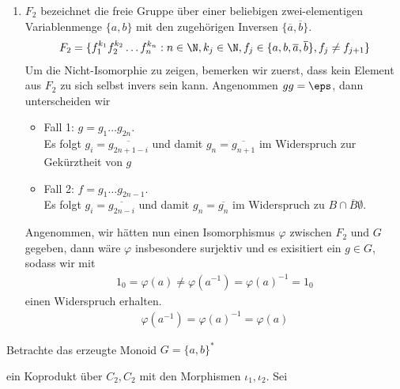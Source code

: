 \begin{solution}
\begin{enumerate}
  \item $F_2$ bezeichnet die freie Gruppe über einer beliebigen zwei-elementigen
  Variablenmenge $\{a,b\}$ mit den zugehörigen Inversen $\{\overline{a},\overline{b}\}$.
  \begin{align*}
    F_2 = \{f_1^{k_1}f_2^{k_2}\dots f_n^{k_n}: n \in \N,k_j \in \N, f_j \in
    \{a,b,\overline{a},\overline{b}\}, f_j \neq f_{j+1}\}
  \end{align*}
  Um die Nicht-Isomorphie zu zeigen, bemerken wir zuerst, dass kein Element aus $F_2$
  zu sich selbst invers sein kann. Angenommen $gg = \eps$, dann unterscheiden wir
  \begin{itemize}
    \item Fall 1: $g = g_1\dots g_{2n}$.\\
    Es folgt $g_i = \overline{g_{2n+1-i}}$ und damit $g_{n} = \overline{g_{n+1}}$
    im Widerspruch zur Gekürztheit von $g$
    \item Fall 2: $f = g_1\dots g_{2n-1}$. \\
    Es folgt $g_i = \overline{g_{2n-i}}$ und damit $g_{n} = \overline{g_n}$
    im Widerspruch zu $B \cap \overline{B} \emptyset$.
  \end{itemize}
  Angenommen, wir hätten nun einen Isomorphismus $\varphi$ zwischen $F_2$ und $G$
  gegeben, dann wäre $\varphi$ insbesondere surjektiv und es exisitiert ein $g \in G$,
  sodass wir mit
  \begin{align*}
    1_0 = \varphi(a) \neq \varphi(a^{-1}) = \varphi(a)^{-1} = 1_0
  \end{align*}
  einen Widerspruch erhalten.
  \begin{align*}
    \varphi(a^{-1}) = \varphi(a)^{-1} = \varphi(a)
  \end{align*}
\end{enumerate}
Betrachte das erzeugte Monoid $G = \{a,b\}^*$

ein Koprodukt über $C_2, C_2$ mit den Morphismen $\iota_1,\iota_2$.
Sei
\end{solution}
